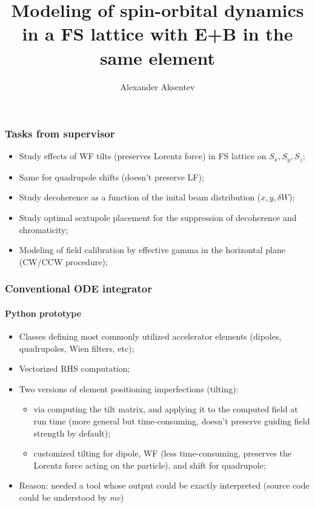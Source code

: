 \documentclass[pdf]{beamer}
\title{Modeling of spin-orbital dynamics in a FS lattice with E+B in the same element}
\author{Alexander Aksentev}
\begin{document}
	\begin{frame}
		\titlepage
	\end{frame}	

	\begin{frame}
		\frametitle{Tasks from supervisor}
		\begin{itemize}
			\item Study effects of WF tilts (preserves Lorentz force) in FS lattice on $S_x, S_y, S_z$;
			\item Same for quadrupole shifts (doesn't preserve LF);
			\item Study decoherence as a function of the inital beam distribution ($x, y, \delta W$);
			\item Study optimal sextupole placement for the suppression of decoherence and chromaticity;
			\item Modeling of field calibration by effective gamma in the horizontal plane (CW/CCW procedure);
		\end{itemize}
	\end{frame}

	\begin{frame}
		\frametitle{Conventional ODE integrator}
		\framesubtitle{Python prototype}
		\begin{itemize}
			\item Classes defining most commonly utilized accelerator elements (dipoles, quadrupoles, Wien filters, etc);
			\item Vectorized RHS computation;
			\item Two versions of element positioning imperfections (tilting):
			\begin{itemize}
				\item via computing the tilt matrix, and applying it to the computed field at run time (more general but time-consuming, doesn't preserve guiding field strength by default);
				\item customized tilting for dipole, WF (less time-consuming, preserves the Lorentz force acting on the particle), and shift for quadrupole;
			\end{itemize}
		\item Reason: needed a tool whose output could be exactly interpreted (source code could be understood by \emph{me})
		\end{itemize}
	\end{frame}
\end{document}
